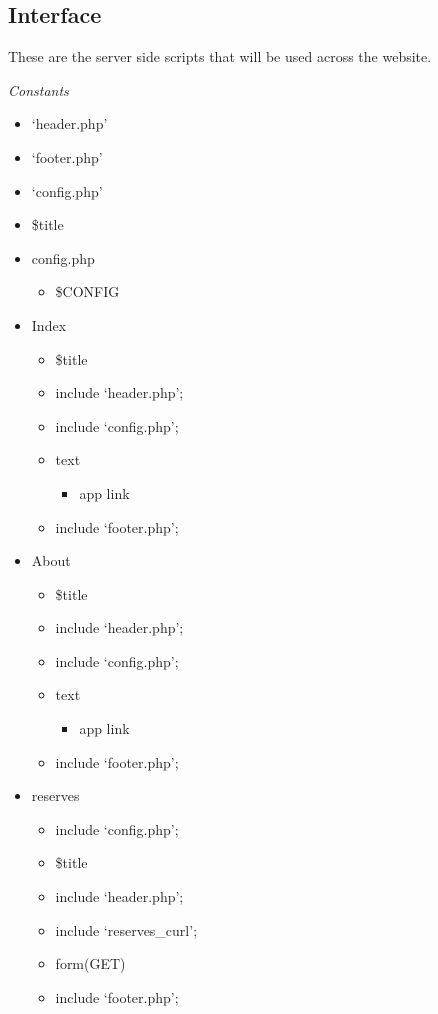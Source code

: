 \subsection{Interface}
	These are the server side scripts that will be used across the website.

		
		\emph{Constants}
		\begin{itemize}
			\item `header.php'
			\item `footer.php'
			\item `config.php'
			\item \$title
	
		\item config.php
		\begin{itemize}
			\item \$CONFIG
		\end{itemize}

		\item Index
		\begin{itemize}
			\item \$title
			\item include `header.php';
			\item include `config.php';
			\item text
			\begin{itemize}
				\item app link
			\end{itemize}
			\item include `footer.php';
		\end{itemize}

		\item About
		\begin{itemize}
			\item \$title
			\item include `header.php';
			\item include `config.php';
			\item text
			\begin{itemize}
				\item app link
			\end{itemize}
			\item include `footer.php';
		\end{itemize}		

		\item reserves
		\begin{itemize}
			\item include `config.php';
			\item \$title
			\item include `header.php';
			\item include `reserves\_curl';
			\item form(GET)
			\item include `footer.php';
		\end{itemize}
		

\end{itemize}
